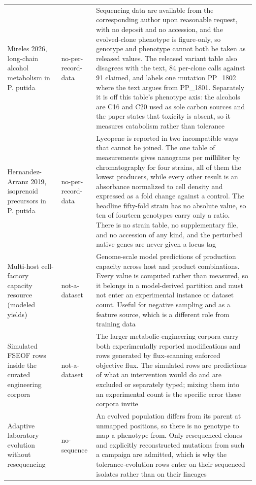 \begin{longtable}{@{}L{58mm} L{28mm} L{83mm}@{}}
\addlinespace[5pt]
Mireles 2026, long-chain alcohol metabolism in P. putida & no-per-record-data & Sequencing data are available from the corresponding author upon reasonable request, with no deposit and no accession, and the evolved-clone phenotype is figure-only, so genotype and phenotype cannot both be taken as released values. The released variant table also disagrees with the text, 84 per-clone calls against 91 claimed, and labels one mutation PP\_1802 where the text argues from PP\_1801. Separately it is off this table's phenotype axis: the alcohols are C16 and C20 used as sole carbon sources and the paper states that toxicity is absent, so it measures catabolism rather than tolerance \\
\addlinespace[5pt]
Hernandez-Arranz 2019, isoprenoid precursors in P. putida & no-per-record-data & Lycopene is reported in two incompatible ways that cannot be joined. The one table of measurements gives nanograms per milliliter by chromatography for four strains, all of them the lowest producers, while every other result is an absorbance normalized to cell density and expressed as a fold change against a control. The headline fifty-fold strain has no absolute value, so ten of fourteen genotypes carry only a ratio. There is no strain table, no supplementary file, and no accession of any kind, and the perturbed native genes are never given a locus tag \\
\addlinespace[5pt]
Multi-host cell-factory capacity resource (modeled yields) & not-a-dataset & Genome-scale model predictions of production capacity across host and product combinations. Every value is computed rather than measured, so it belongs in a model-derived partition and must not enter an experimental instance or dataset count. Useful for negative sampling and as a feature source, which is a different role from training data \\
\addlinespace[5pt]
Simulated FSEOF rows inside the curated engineering corpora & not-a-dataset & The larger metabolic-engineering corpora carry both experimentally reported modifications and rows generated by flux-scanning enforced objective flux. The simulated rows are predictions of what an intervention would do and are excluded or separately typed; mixing them into an experimental count is the specific error these corpora invite \\
\addlinespace[5pt]
Adaptive laboratory evolution without resequencing & no-sequence & An evolved population differs from its parent at unmapped positions, so there is no genotype to map a phenotype from. Only resequenced clones and explicitly reconstructed mutations from such a campaign are admitted, which is why the tolerance-evolution rows enter on their sequenced isolates rather than on their lineages \\

\end{longtable}
